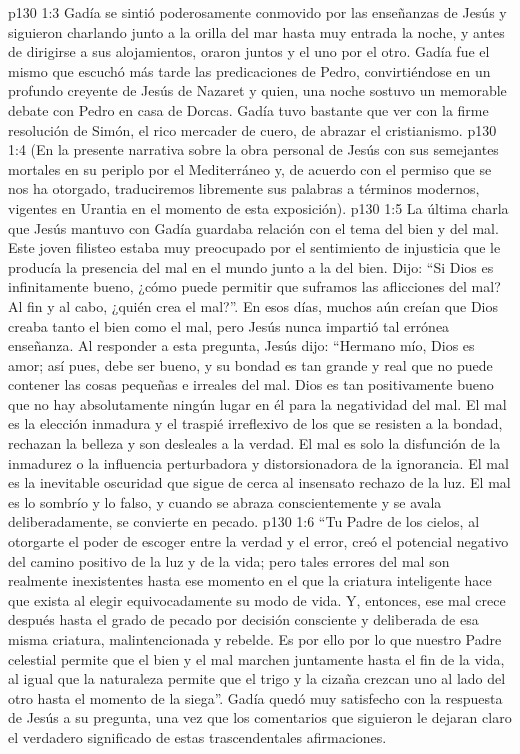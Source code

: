 \vs p130 1:3 Gadía se sintió poderosamente conmovido por las enseñanzas de Jesús y siguieron charlando junto a la orilla del mar hasta muy entrada la noche, y antes de dirigirse a sus alojamientos, oraron juntos y el uno por el otro. Gadía fue el mismo que escuchó más tarde las predicaciones de Pedro, convirtiéndose en un profundo creyente de Jesús de Nazaret y quien, una noche sostuvo un memorable debate con Pedro en casa de Dorcas. Gadía tuvo bastante que ver con la firme resolución de Simón, el rico mercader de cuero, de abrazar el cristianismo.
\vs p130 1:4 \pc (En la presente narrativa sobre la obra personal de Jesús con sus semejantes mortales en su periplo por el Mediterráneo y, de acuerdo con el permiso que se nos ha otorgado, traduciremos libremente sus palabras a términos modernos, vigentes en Urantia en el momento de esta exposición).
\vs p130 1:5 \pc La última charla que Jesús mantuvo con Gadía guardaba relación con el tema del bien y del mal. Este joven filisteo estaba muy preocupado por el sentimiento de injusticia que le producía la presencia del mal en el mundo junto a la del bien. Dijo: “Si Dios es infinitamente bueno, ¿cómo puede permitir que suframos las aflicciones del mal? Al fin y al cabo, ¿quién crea el mal?”. En esos días, muchos aún creían que Dios creaba tanto el bien como el mal, pero Jesús nunca impartió tal errónea enseñanza. Al responder a esta pregunta, Jesús dijo: “Hermano mío, Dios es amor; así pues, debe ser bueno, y su bondad es tan grande y real que no puede contener las cosas pequeñas e irreales del mal. Dios es tan positivamente bueno que no hay absolutamente ningún lugar en él para la negatividad del mal. El mal es la elección inmadura y el traspié irreflexivo de los que se resisten a la bondad, rechazan la belleza y son desleales a la verdad. El mal es solo la disfunción de la inmadurez o la influencia perturbadora y distorsionadora de la ignorancia. El mal es la inevitable oscuridad que sigue de cerca al insensato rechazo de la luz. El mal es lo sombrío y lo falso, y cuando se abraza conscientemente y se avala deliberadamente, se convierte en pecado.
\vs p130 1:6 “Tu Padre de los cielos, al otorgarte el poder de escoger entre la verdad y el error, creó el potencial negativo del camino positivo de la luz y de la vida; pero tales errores del mal son realmente inexistentes hasta ese momento en el que la criatura inteligente hace que exista al elegir equivocadamente su modo de vida. Y, entonces, ese mal crece después hasta el grado de pecado por decisión consciente y deliberada de esa misma criatura, malintencionada y rebelde. Es por ello por lo que nuestro Padre celestial permite que el bien y el mal marchen juntamente hasta el fin de la vida, al igual que la naturaleza permite que el trigo y la cizaña crezcan uno al lado del otro hasta el momento de la siega”. Gadía quedó muy satisfecho con la respuesta de Jesús a su pregunta, una vez que los comentarios que siguieron le dejaran claro el verdadero significado de estas trascendentales afirmaciones.
